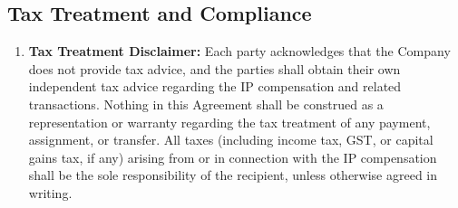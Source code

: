 \subsection{Tax Treatment and Compliance}
\begin{enumerate}[label=(\alph*)]
\item \textbf{Tax Treatment Disclaimer:} Each party acknowledges that the Company does not provide tax advice, and the parties shall obtain their own independent tax advice regarding the IP compensation and related transactions. Nothing in this Agreement shall be construed as a representation or warranty regarding the tax treatment of any payment, assignment, or transfer. All taxes (including income tax, GST, or capital gains tax, if any) arising from or in connection with the IP compensation shall be the sole responsibility of the recipient, unless otherwise agreed in writing.
\end{enumerate}